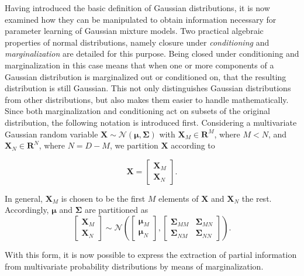 \documentclass[../../../main.tex]{subfiles}
\begin{document}
Having introduced the basic definition of Gaussian distributions, it is now examined how they can be manipulated to obtain information necessary for parameter learning of Gaussian mixture models. Two practical algebraic properties of normal distributions, namely closure under \textit{conditioning} and \textit{marginalization} are detailed for this purpose. Being closed under conditioning and marginalization in this case means that when one or more components of a Gaussian distribution is marginalized out or conditioned on, that the resulting distribution is still Gaussian. This not only distinguishes Gaussian distributions from other distributions, but also makes them easier to handle mathematically. Since both marginalization and conditioning act on subsets of the original distribution, the following notation is introduced first. Considering a multivariate Gaussian random variable $\bm{X} \sim \mathcal{N}(\bm{\mu}, \bm{\Sigma})$ with $\bm{X}_M \in \mathbf{R}^M$, where $M < N$, and $\bm{X}_N \in \mathbf{R}^N$, where $N=D-M$, we partition $\bm{X}$ according to 

\begin{equation*}
    \bm{X} = \left[ \begin{array}{c}
        \bm{X}_M \\
        \bm{X}_N
    \end{array} \right].
\end{equation*}

In general, $\bm{X}_M$ is chosen to be the first $M$ elements of $\bm{X}$ and $\bm{X}_N$ the rest. Accordingly, $\bm{\mu}$ and $\bm{\Sigma}$ are partitioned as
\begin{equation*}
    \left[ \begin{array}{c}
        \bm{X}_M \\
        \bm{X}_N
    \end{array} \right] \sim \mathcal{N} \left( \left[\begin{array}{c}
         \bm{\mu}_M \\
         \bm{\mu}_N
    \end{array}\right], \left[\begin{array}{cc}
        \bm{\Sigma}_{MM} & \bm{\Sigma}_{MN} \\
        \bm{\Sigma}_{NM} & \bm{\Sigma}_{NN}
    \end{array}\right] \right).
\end{equation*}

With this form, it is now possible to express the extraction of partial information from multivariate probability distributions by means of marginalization. 
\end{document}
